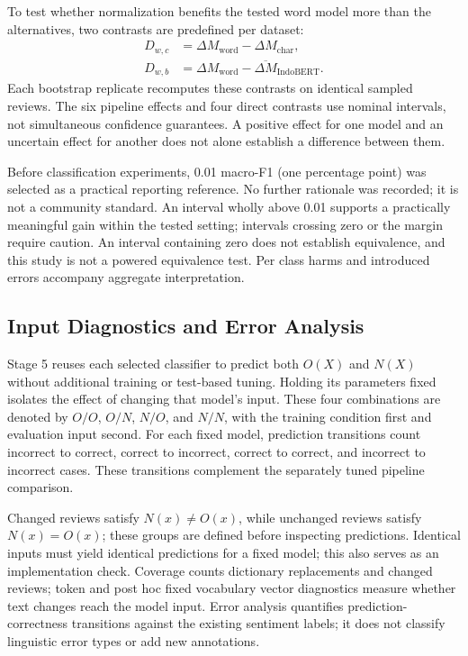 To test whether normalization benefits the tested word model more than the alternatives, two contrasts are predefined per dataset:
\begin{align}
D_{w,c} &= \Delta M_{\mathrm{word}}-\Delta M_{\mathrm{char}},\\
D_{w,b} &= \Delta M_{\mathrm{word}}-\overline{\Delta M}_{\mathrm{IndoBERT}}.
\end{align}
Each bootstrap replicate recomputes these contrasts on identical sampled reviews. The six pipeline effects and four direct contrasts use nominal intervals, not simultaneous confidence guarantees. A positive effect for one model and an uncertain effect for another does not alone establish a difference between them.

Before classification experiments, 0.01 macro-F1 (one percentage point) was selected as a practical reporting reference. No further rationale was recorded; it is not a community standard. An interval wholly above 0.01 supports a practically meaningful gain within the tested setting; intervals crossing zero or the margin require caution. An interval containing zero does not establish equivalence, and this study is not a powered equivalence test. Per class harms and introduced errors accompany aggregate interpretation.



\subsection{Input Diagnostics and Error Analysis}
Stage 5 reuses each selected classifier to predict both $O(X)$ and $N(X)$ without additional training or test-based tuning. Holding its parameters fixed isolates the effect of changing that model's input. These four combinations are denoted by $O/O$, $O/N$, $N/O$, and $N/N$, with the training condition first and evaluation input second. For each fixed model, prediction transitions count incorrect to correct, correct to incorrect, correct to correct, and incorrect to incorrect cases. These transitions complement the separately tuned pipeline comparison.

Changed reviews satisfy $N(x)\ne O(x)$, while unchanged reviews satisfy $N(x)=O(x)$; these groups are defined before inspecting predictions. Identical inputs must yield identical predictions for a fixed model; this also serves as an implementation check. Coverage counts dictionary replacements and changed reviews; token and post hoc fixed vocabulary vector diagnostics measure whether text changes reach the model input. Error analysis quantifies prediction-correctness transitions against the existing sentiment labels; it does not classify linguistic error types or add new annotations.

